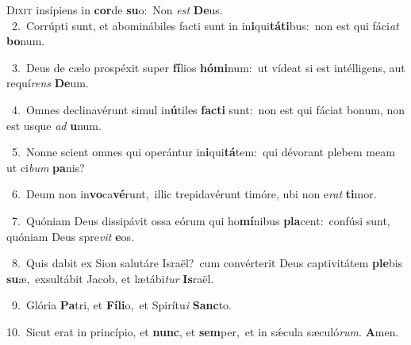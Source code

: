 \lettrine{\initial\textcolor{\initialcolor}{D}}{ixit} insípiens in \textbf{cor}\-de \textbf{su}\-o:~\star Non \textit{est} \textbf{De}\-us.\\
{\numbfont\textcolor{\numbcolor}{~2.}}~Corrúpti sunt, et abominábiles facti sunt in in\-\textbf{i}\-qui\-\textbf{tá}\-\textbf{ti}bus:~\star non est qui fáci\textit{at} \textbf{bo}\-num.\par
{\numbfont\textcolor{\numbcolor}{~3.}}~Deus de cælo prospéxit super \textbf{fí}\-lios \textbf{hó}\-\textbf{mi}num:~\star ut vídeat si est intélligens, aut requí\textit{rens} \textbf{De}\-um.\par
{\numbfont\textcolor{\numbcolor}{~4.}}~Omnes declinavérunt simul in\-\textbf{ú}\-tiles \textbf{fac}\-\textbf{ti} sunt:~\star non est qui fáciat bonum, non est usque \textit{ad} \textbf{u}\-num.\par
{\numbfont\textcolor{\numbcolor}{~5.}}~Nonne scient omnes qui operántur in\-\textbf{i}\-qui\-\textbf{tá}\-tem:~\star qui dévorant plebem meam ut ci\textit{bum} \textbf{pa}\-nis?\par
{\numbfont\textcolor{\numbcolor}{~6.}}~Deum non in\-\textbf{vo}\-ca\-\textbf{vé}\-runt,~\star illic trepidavérunt timóre, ubi non e\textit{rat} \textbf{ti}\-mor.\par
{\numbfont\textcolor{\numbcolor}{~7.}}~Quóniam Deus dissipávit ossa eórum qui ho\-\textbf{mí}\-nibus \textbf{pla}\-cent:~\star confúsi sunt, quóniam Deus spre\textit{vit} \textbf{e}\-os.\par
{\numbfont\textcolor{\numbcolor}{~8.}}~Quis dabit ex Sion salutáre Israël?~\dagger cum convérterit Deus captivitátem \textbf{ple}\-bis \textbf{su}\-æ,~\star exsultábit Jacob, et lætábi\textit{tur} \textbf{Is}\-raël.\par
{\numbfont\textcolor{\numbcolor}{~9.}}~Glória \textbf{Pa}\-tri, et \textbf{Fí}\-\textbf{li}o,~\star et Spirítu\textit{i} \textbf{Sanc}\-to.\par
{\numbfont\textcolor{\numbcolor}{10.}}~Sicut erat in princípio, et \textbf{nunc}\-, et \textbf{sem}\-per,~\star et in sǽcula sæculó\-\textit{rum}\-. \textbf{A}\-men.\par
